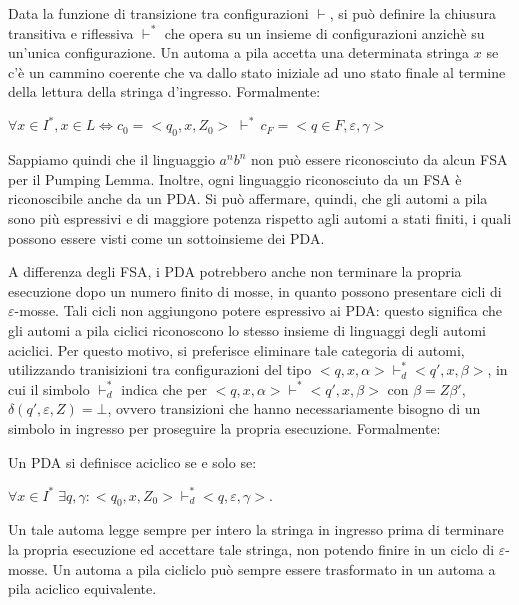   Data la funzione di transizione tra configurazioni \(\vdash\), si può definire la chiusura transitiva e riflessiva \(\vdash^*\) che opera su un insieme di configurazioni anzichè su un'unica configurazione. Un automa a pila accetta una determinata stringa \(x\) se c’è un cammino coerente che va dallo stato iniziale ad uno stato finale al termine della lettura della stringa d’ingresso. Formalmente:

  \begin{math}
    \forall x \in I^*, x \in L \iff c_0=<q_0,x, Z_0>\;\vdash^*\,c_F=<q\in F, \varepsilon, \gamma>
  \end{math}

  \vspace{10pt}

  Sappiamo quindi che il linguaggio \(a^nb^n\) non può essere riconosciuto da alcun FSA per il Pumping Lemma. Inoltre, ogni linguaggio riconosciuto da un FSA è riconoscibile anche da un PDA. Si può affermare, quindi, che gli automi a pila sono più espressivi e di maggiore potenza rispetto agli automi a stati finiti, i quali possono essere visti come un sottoinsieme dei PDA. 

  A differenza degli FSA, i PDA potrebbero anche non terminare la propria esecuzione dopo un numero finito di mosse, in quanto possono presentare cicli di \(\varepsilon\)-mosse. Tali cicli non aggiungono potere espressivo ai PDA: questo significa che gli automi a pila ciclici riconoscono lo stesso insieme di linguaggi degli automi aciclici. Per questo motivo, si preferisce eliminare tale categoria di automi, utilizzando tranisizioni tra configurazioni del tipo \(<q,x,\alpha>\vdash^*_d<q',x,\beta>\), in cui il simbolo \(\vdash_d^*\) indica che per \(<q,x,\alpha>\vdash^*<q',x,\beta>\) con \(\beta = Z\beta'\), \(\delta(q', \varepsilon, Z) = \bot\), ovvero transizioni che hanno necessariamente bisogno di un simbolo in ingresso per proseguire la propria esecuzione. Formalmente:

  \begin{definition}
    Un PDA si definisce aciclico se e solo se:

    \begin{math}
      \forall x \in I^*\; \exists q,\gamma : <q_0, x, Z_0> \vdash_d^* <q, \varepsilon, \gamma>.
    \end{math}
  \end{definition}

  Un tale automa legge sempre per intero la stringa in ingresso prima di terminare la propria esecuzione ed accettare tale stringa, non potendo finire in un ciclo di \(\varepsilon\)-mosse. Un automa a pila cicliclo può sempre essere trasformato in un automa a pila aciclico equivalente.

